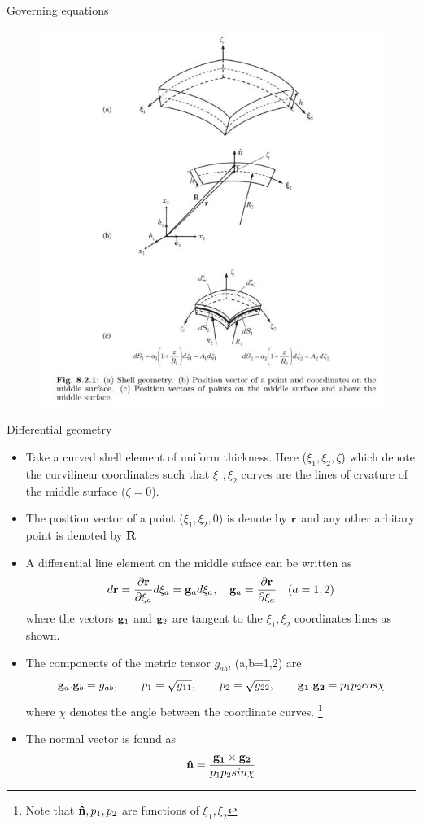 	\begin{frame}{Governing equations}
		\begin{figure}
			\centering
			\includegraphics[width=0.65\linewidth]{Figure/fig48}  		
		\end{figure}
	\end{frame}


	\begin{frame}{Differential geometry}
		\begin{itemize}
			\item Take a curved shell element of uniform thickness. Here ($\xi_1,\xi_2,\zeta$) which denote the curvilinear coordinates such that $\xi_1, \xi_2$ curves are the lines of crvature of the middle surface ($\zeta = 0$). 
			\item The position vector of a point ($\xi_1,\xi_2,0$) is denote by $\mathbf{r}$ and any other arbitary point is denoted by $\mathbf{R}$
			\item A differential line element on the middle suface can be written as 
			\begin{equation}
			d\mathbf{r} = \frac{\partial \mathbf{r}}{\partial \xi_a}d\xi_a = \mathbf{g}_a d\xi_a , \quad \mathbf{g}_a = \frac{\partial \mathbf{r}}{\partial \xi_a} \quad (a =1,2)
			\end{equation}
			where the vectors $\mathbf{g}_1$ and $\mathbf{g}_2$ are tangent to the $\xi_1,\xi_2$ coordinates lines as shown.
			\item  The components of the metric tensor $g_{ab}$, (a,b=1,2) are 
			\begin{equation}
			\mathbf{g}_a.\mathbf{g}_b = g_{ab},  \qquad p_1 = \sqrt{g_{11}}, \qquad p_2 = \sqrt{g_{22}}, \qquad \mathbf{g_1.g_2} = p_1p_2cos \chi
			\end{equation}
			where $\chi$ denotes the angle between the coordinate curves. \footnote{Note that $\mathbf{\hat{n}},p_1,p_2$ are functions of $\xi_1,\xi_2$}
			\item The normal vector is found as
			\begin{equation}
			\mathbf{\hat{n}} = \frac{\mathbf{g_1 \times g_2}}{p_1p_2sin \chi}
			\end{equation}
		\end{itemize}	
	\end{frame}


